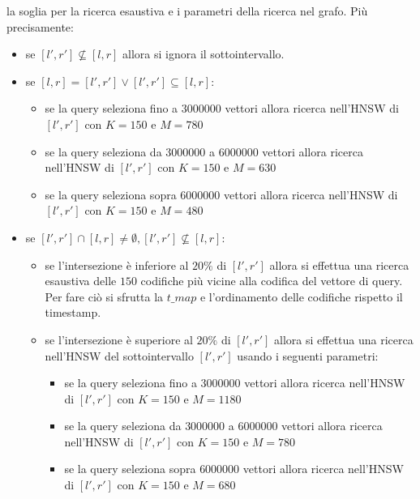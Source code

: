 \begin{itemize}
    la soglia per la ricerca esaustiva e i parametri della ricerca nel grafo. Più 
    precisamente:
    \begin{itemize}
        \item se $[l',r'] \not \subseteq [l,r]$ allora si ignora il sottointervallo.
        \item se $[l,r] = [l',r'] \lor  [l',r'] \subseteq [l,r]$:
        \begin{itemize}
            \item se la query seleziona fino a $3000000$ vettori allora ricerca 
            nell'HNSW di $[l',r']$ con $K=150$ e $M=780$
            \item se la query seleziona da $3000000$ a $6000000$ vettori allora ricerca 
            nell'HNSW di $[l',r']$ con $K=150$ e $M=630$
            \item se la query seleziona sopra $6000000$ vettori allora ricerca 
            nell'HNSW di $[l',r']$ con $K=150$ e $M=480$
        \end{itemize}
        \item se $[l',r'] \cap [l,r] \ne \emptyset, [l',r'] \not \subseteq [l,r]$:
        \begin{itemize}
            \item se l'intersezione è inferiore al $20\%$ di $[l',r']$ allora si effettua una 
            ricerca esaustiva delle $150$ codifiche più vicine alla codifica del 
            vettore di query. Per fare ciò si sfrutta la $t\_map$ e 
            l'ordinamento delle codifiche rispetto il timestamp.
            \item se l'intersezione è superiore al $20\%$ di $[l',r']$ allora si effettua una 
            ricerca nell'HNSW del sottointervallo $[l',r']$ usando i seguenti parametri:
            \begin{itemize}
                \item se la query seleziona fino a $3000000$ vettori allora ricerca 
                nell'HNSW di $[l',r']$ con $K=150$ e $M=1180$
                \item se la query seleziona da $3000000$ a $6000000$ vettori allora ricerca 
                nell'HNSW di $[l',r']$ con $K=150$ e $M=780$
                \item se la query seleziona sopra $6000000$ vettori allora ricerca 
                nell'HNSW di $[l',r']$ con $K=150$ e $M=680$
            \end{itemize}
        \end{itemize}
    \end{itemize}
\end{itemize}

